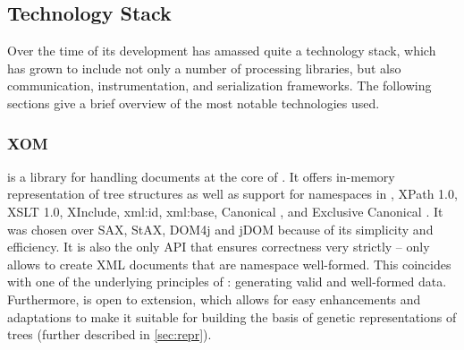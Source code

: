 \subsection{Technology Stack}
\label{sec:tech}
Over the time of its development \xmlmate has amassed quite a technology stack, which has grown to include not
only a number of \xml processing libraries, but also communication, instrumentation, and serialization
frameworks. The following sections give a brief overview of the most notable technologies used.
\tocless\subsubsection{XOM}
\xom{}\cite{xom} is a \java library for handling \xml documents at the core of \xmlmate. 
It offers in-memory representation of \xml tree structures as well as support for namespaces in \xml, 
XPath 1.0, XSLT 1.0, XInclude, xml:id, xml:base, Canonical \xml, and Exclusive Canonical \xml.
It was chosen over SAX, StAX, DOM4j and jDOM because of its simplicity and
efficiency.
It is also the only \xml API that ensures correctness very strictly -- \xom only allows to create XML documents
that are namespace well-formed. 
This coincides with one of the underlying principles of \xmlmate: generating valid and well-formed data.
Furthermore, \xom is open to extension, which allows for easy enhancements and adaptations to make it suitable 
for building the basis of genetic representations of \xml trees (further described in \cref{sec:repr}).

